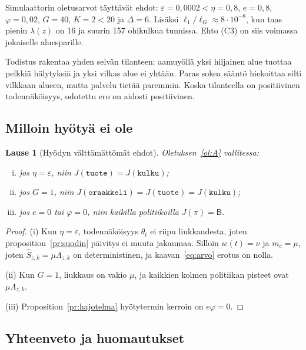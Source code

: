 \documentclass[11pt,a4paper]{article}
\theoremstyle{plain}
\newtheorem{lause}{Lause}
\theoremstyle{definition}
\theoremstyle{remark}
\newcommand{\1}{\mathbf{1}}
\newcommand{\pol}[1]{\texttt{#1}}
\begin{document}
Simulaattorin oletusarvot täyttävät ehdot: $\varepsilon = 0{,}0002 < \eta = 0{,}8$,
$e = 0{,}8$, $\varphi = 0{,}02$, $G = 40$, $K = 2 < 20$ ja $\Delta = 6$. Lisäksi
$\ell_1/\ell_G \approx 8 \cdot 10^{-8}$, kun taas pienin $\lambda(z)$ on 16 ja
suurin 157 ohikulkua tunnissa. Ehto (C3) on siis voimassa jokaiselle
aluesparille.

\begin{intuitio}
Todistus rakentaa yhden selvän tilanteen: aamuyöllä yksi hiljainen alue tuottaa
pelkkiä hälytyksiä ja yksi vilkas alue ei yhtään. Paras sokea sääntö
hiekoittaa silti vilkkaan alueen, mutta palvelu tietää paremmin. Koska
tilanteella on positiivinen todennäköisyys, odotettu ero on aidosti positiivinen.
\end{intuitio}

\subsection{Milloin hyötyä ei ole}

\begin{lause}[Hyödyn välttämättömät ehdot]\label{la:valttamaton}
Oletuksen~\ref{ol:A} vallitessa:
\begin{enumerate}[(i)]
  \item jos $\eta = \varepsilon$, niin $J(\pol{tuote}) = J(\pol{kulku})$;
  \item jos $G = 1$, niin $J(\pol{oraakkeli}) = J(\pol{tuote}) = J(\pol{kulku})$;
  \item jos $e = 0$ tai $\varphi = 0$, niin kaikilla politiikoilla $J(\pi) = \mathsf{B}$.
\end{enumerate}
\end{lause}

\begin{proof}
(i) Kun $\eta = \varepsilon$, todennäköisyys $\theta_t$ ei riipu liukkaudesta,
joten proposition~\ref{pr:suodin} päivitys ei muuta jakaumaa. Silloin
$w(t) = \nu$ ja $m_c = \mu$, joten $\hat S_{z,k} = \mu\Lambda_{z,k}$ on
deterministinen, ja kaavan~\eqref{eq:arvo} erotus on nolla.

(ii) Kun $G = 1$, liukkaus on vakio $\mu$, ja kaikkien kolmen politiikan
pisteet ovat $\mu\Lambda_{z,k}$.

(iii) Proposition~\ref{pr:hajotelma} hyötytermin kerroin on $e\varphi = 0$.
\end{proof}

\subsection{Yhteenveto ja huomautukset}
\end{document}
